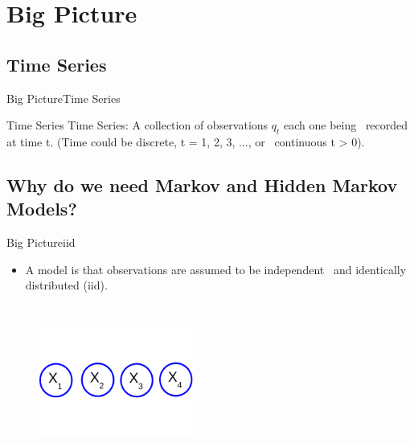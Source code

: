 \documentclass[10pt]{beamer}
\begin{document}
\section{Big Picture}
\subsection{Time Series}
\begin{frame}{Big Picture}{Time Series}
  \begin{block}{Time Series}
          Time Series: A collection of observations $q_t$ each one being \
          recorded at time t. (Time could be discrete, t = 1, 2, 3, ..., or \
          continuous t > 0). \cite{Richard}
  \end{block}
\end{frame}

\subsection{Why do we need Markov and Hidden Markov Models?}
\begin{frame}{Big Picture}{iid}
  \begin{itemize}
    \item A model is that observations are assumed to be independent \
          and identically distributed (iid). \cite{Thomas}
  \end{itemize}
  \begin{figure}[h]
    \centering
    \includegraphics[width=2in,height=2in]{figures/idd.png}
  \end{figure}
\end{frame}
\end{document}
